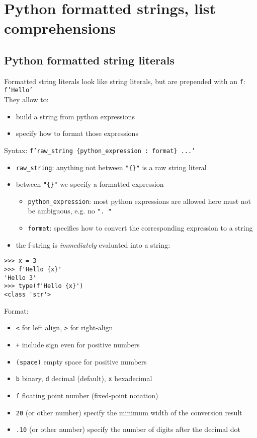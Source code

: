 \documentclass[12pt]{article}
\begin{document}
\newpage
\section{Python formatted strings, list comprehensions}

\subsection{Python formatted string literals}

Formatted string literals look like string literals, but are prepended with an \texttt{f}:\\

\texttt{f'Hello'}\\

They allow  to:
\begin{itemize}
    \item build a string from python expressions
    \item specify how to format those expressions
\end{itemize}

Syntax:
\texttt{f'raw\_string \{python\_expression : format\} ...'}

\begin{itemize}
    \item \texttt{raw\_string}: anything not between \texttt{"\{\}"} is a raw string literal
    \item between \texttt{"\{\}"} we specify a formatted expression
    \begin{itemize}
        \item \texttt{python\_expression}: most python expressions are allowed here must not be ambiguous, e.g. no \texttt{". "}
        \item \texttt{format}: specifies how to convert the corresponding expression to a string
    \end{itemize}
    \item the f-string is \textit{immediately} evaluated into a string:
\end{itemize}

\begin{lstlisting}
>>> x = 3
>>> f'Hello {x}'
'Hello 3'
>>> type(f'Hello {x}')
<class 'str'>
\end{lstlisting}

Format:
\begin{itemize}
    \item \texttt{<} for left align, \texttt{>} for right-align
    \item \texttt{+} include sign even for positive numbers
    \item \texttt{(space)} empty space for positive numbers
    \item \texttt{b} binary, \texttt{d} decimal (default), \texttt{x} hexadecimal
    \item \texttt{f} floating point number (fixed-point notation)
    \item \texttt{20} (or other number) specify the minimum width of the conversion result
    \item \texttt{.10} (or other number) specify the number of digits after the decimal dot
\end{itemize}
\end{document}
